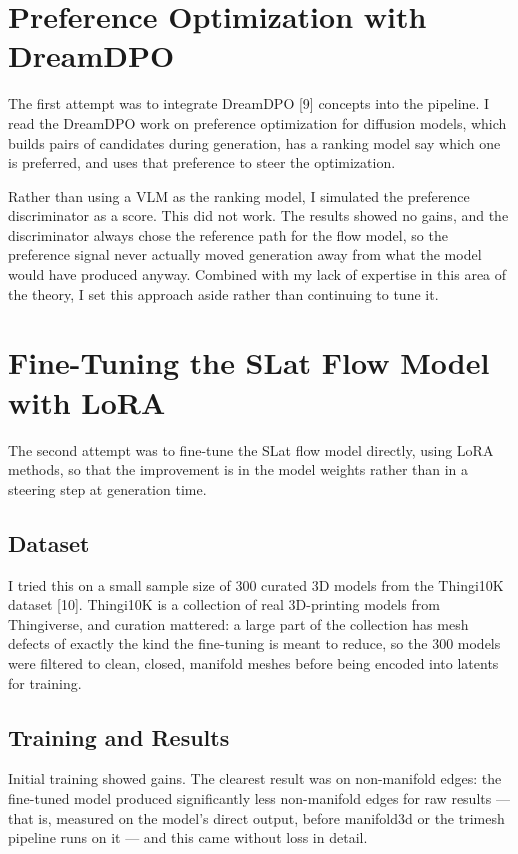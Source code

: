 \documentclass[11pt,a4paper]{article}
\begin{document}
\section{Preference Optimization with DreamDPO}
The first attempt was to integrate DreamDPO [9] concepts into the pipeline. I read the DreamDPO work on preference optimization for diffusion models, which builds pairs of candidates during generation, has a ranking model say which one is preferred, and uses that preference to steer the optimization.

Rather than using a VLM as the ranking model, I simulated the preference discriminator as a score. This did not work. The results showed no gains, and the discriminator always chose the reference path for the flow model, so the preference signal never actually moved generation away from what the model would have produced anyway. Combined with my lack of expertise in this area of the theory, I set this approach aside rather than continuing to tune it.


\section{Fine-Tuning the SLat Flow Model with LoRA}
The second attempt was to fine-tune the SLat flow model directly, using LoRA methods, so that the improvement is in the model weights rather than in a steering step at generation time.

\subsection{Dataset}
I tried this on a small sample size of 300 curated 3D models from the Thingi10K dataset [10]. Thingi10K is a collection of real 3D-printing models from Thingiverse, and curation mattered: a large part of the collection has mesh defects of exactly the kind the fine-tuning is meant to reduce, so the 300 models were filtered to clean, closed, manifold meshes before being encoded into latents for training.

\subsection{Training and Results}
Initial training showed gains. The clearest result was on non-manifold edges: the fine-tuned model produced significantly less non-manifold edges for raw results --- that is, measured on the model's direct output, before manifold3d or the trimesh pipeline runs on it --- and this came without loss in detail.
\end{document}
